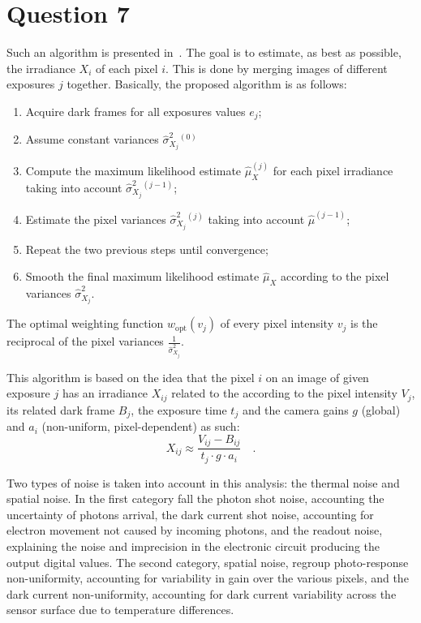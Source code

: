 \documentclass{report}
\begin{document}
\section{Question 7}

Such an algorithm is presented in~\cite{Granados2010a}. The goal is to estimate, as best as possible, the irradiance $X_i$ of each pixel $i$. This is done by merging images of different exposures $j$ together. Basically, the proposed algorithm is as follows:
\begin{enumerate}
  \item{Acquire dark frames for all exposures values $e_j$;}
  \item{Assume constant variances $\hat{\sigma}_{X_j}^2{}^{(0)}$}
  \item{Compute the maximum likelihood estimate $\hat{\mu}_X^{(j)}$ for each pixel irradiance taking into account $\hat{\sigma}_{X_j}^2{}^{(j-1)}$;}
  \item{Estimate the pixel variances $\hat{\sigma}_{X_j}^2{}^{(j)}$ taking into account $\hat{\mu}^{(j-1)}$;}
  \item{Repeat the two previous steps until convergence;}
  \item{Smooth the final maximum likelihood estimate $\hat{\mu}_X$ according to the pixel variances $\hat{\sigma}_{X_j}^2$}.
\end{enumerate}

The optimal weighting function $w_{\mathrm{opt}}\left(v_j\right)$ of every pixel intensity $v_j$ is the reciprocal of the pixel variances $\frac{1}{\hat{\sigma}_{X_j}^2}$.

This algorithm is based on the idea that the pixel $i$ on an image of given exposure $j$ has an irradiance $X_{ij}$ related to the according to the pixel intensity $V_j$, its related dark frame $B_j$, the exposure time $t_j$ and the camera gains $g$ (global) and $a_i$ (non-uniform, pixel-dependent) as such:
\begin{equation}
\label{q7:eqirr}
X_{ij} \approx \frac{V_{ij} - B_{ij}}{t_j \cdot g \cdot a_i}
\quad.
\end{equation}

Two types of noise is taken into account in this analysis: the thermal noise and spatial noise. In the first category fall the photon shot noise, accounting the uncertainty of photons arrival, the dark current shot noise, accounting for electron movement not caused by incoming photons, and the readout noise, explaining the noise and imprecision in the electronic circuit producing the output digital values. The second category, spatial noise, regroup photo-response non-uniformity, accounting for variability in gain over the various pixels, and the dark current non-uniformity, accounting for dark current variability across the sensor surface due to temperature differences.
\end{document}
